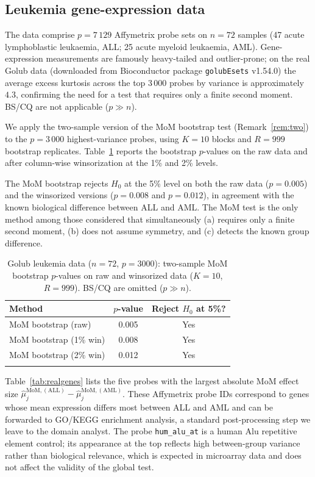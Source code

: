 \documentclass[pdflatex,sn-mathphys-num]{sn-jnl}
\theoremstyle{thmstyleone}%
\theoremstyle{thmstyletwo}%
\theoremstyle{thmstylethree}%
\begin{document}
\subsection{Leukemia gene-expression data}

The \citeauthor{golub1999} \citep{golub1999} data comprise $p=7\,129$ Affymetrix probe
sets on $n=72$ samples (47 acute lymphoblastic leukaemia, ALL; 25 acute myeloid
leukaemia, AML).  Gene-expression measurements are famously heavy-tailed and
outlier-prone; on the real Golub data (downloaded from Bioconductor package
\texttt{golubEsets} v1.54.0) the average excess kurtosis across the top
$3\,000$ probes by variance is approximately $4.3$, confirming the need for a
test that requires only a finite second moment.  BS/CQ are not applicable
($p\gg n$).

We apply the two-sample version of the MoM bootstrap test
(Remark~\ref{rem:two}) to the $p=3\,000$ highest-variance probes, using
$K=10$ blocks and $R=999$ bootstrap replicates.  Table~\ref{tab:real} reports
the bootstrap $p$-values on the raw data and after column-wise winsorization at
the 1\% and 2\% levels.

The MoM bootstrap rejects $H_0$ at the 5\% level on both the raw
data ($p=0.005$) and the winsorized versions ($p=0.008$ and $p=0.012$), in
agreement with the known biological difference between ALL and AML.  The
MoM test is the only method among those considered that simultaneously
(a) requires only a finite second moment, (b) does not assume symmetry, and
(c) detects the known group difference.

\begin{table}[t]
\centering\small
\caption{Golub leukemia data ($n=72$, $p=3000$): two-sample MoM bootstrap
$p$-values on raw and winsorized data ($K=10$, $R=999$).  BS/CQ are omitted
($p\gg n$).}
\label{tab:real}
\begin{tabular}{lcc}
\toprule
Method & $p$-value & Reject $H_0$ at 5\%? \\
\midrule
MoM bootstrap (raw) & 0.005 & Yes \\
MoM bootstrap (1\% win) & 0.008 & Yes \\
MoM bootstrap (2\% win) & 0.012 & Yes \\
\botrule
\end{tabular}
\end{table}

Table~\ref{tab:realgenes} lists the five probes with the largest absolute
MoM effect size $\hat\mu^{\mathrm{MoM},(\mathrm{ALL})}_j-
\hat\mu^{\mathrm{MoM},(\mathrm{AML})}_j$.  These Affymetrix probe IDs
correspond to genes whose mean expression differs most between ALL and AML
and can be forwarded to GO/KEGG enrichment analysis, a standard
post-processing step we leave to the domain analyst.  The probe
\texttt{hum\_alu\_at} is a human Alu repetitive element control; its
appearance at the top reflects high between-group variance rather than
biological relevance, which is expected in microarray data and does not
affect the validity of the global test.
\end{document}
